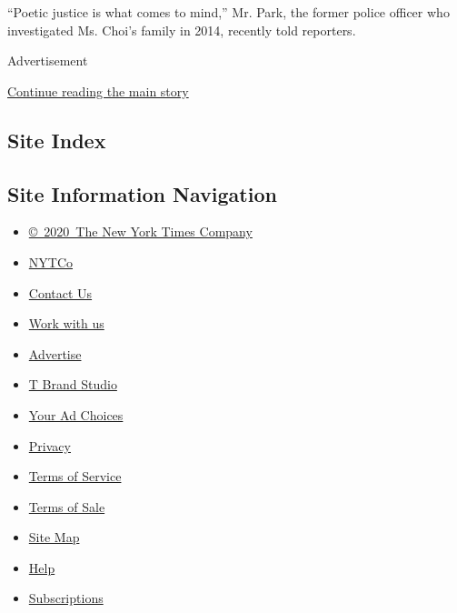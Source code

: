 ``Poetic justice is what comes to mind,'' Mr. Park, the former police
officer who investigated Ms. Choi's family in 2014, recently told
reporters.

Advertisement

\protect\hyperlink{after-bottom}{Continue reading the main story}

\hypertarget{site-index}{%
\subsection{Site Index}\label{site-index}}

\hypertarget{site-information-navigation}{%
\subsection{Site Information
Navigation}\label{site-information-navigation}}

\begin{itemize}
\tightlist
\item
  \href{https://help.nytimes3xbfgragh.onion/hc/en-us/articles/115014792127-Copyright-notice}{©~2020~The
  New York Times Company}
\end{itemize}

\begin{itemize}
\tightlist
\item
  \href{https://www.nytco.com/}{NYTCo}
\item
  \href{https://help.nytimes3xbfgragh.onion/hc/en-us/articles/115015385887-Contact-Us}{Contact
  Us}
\item
  \href{https://www.nytco.com/careers/}{Work with us}
\item
  \href{https://nytmediakit.com/}{Advertise}
\item
  \href{http://www.tbrandstudio.com/}{T Brand Studio}
\item
  \href{https://www.nytimes3xbfgragh.onion/privacy/cookie-policy\#how-do-i-manage-trackers}{Your
  Ad Choices}
\item
  \href{https://www.nytimes3xbfgragh.onion/privacy}{Privacy}
\item
  \href{https://help.nytimes3xbfgragh.onion/hc/en-us/articles/115014893428-Terms-of-service}{Terms
  of Service}
\item
  \href{https://help.nytimes3xbfgragh.onion/hc/en-us/articles/115014893968-Terms-of-sale}{Terms
  of Sale}
\item
  \href{https://spiderbites.nytimes3xbfgragh.onion}{Site Map}
\item
  \href{https://help.nytimes3xbfgragh.onion/hc/en-us}{Help}
\item
  \href{https://www.nytimes3xbfgragh.onion/subscription?campaignId=37WXW}{Subscriptions}
\end{itemize}
